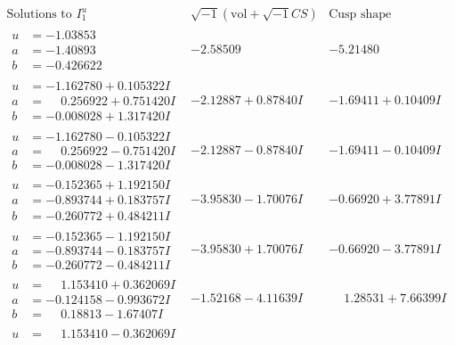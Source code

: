 \documentclass[1p]{elsarticle_modified}
\theoremstyle{definition}
\newcommand{\I}{\sqrt{-1}}
\begin{document}
$$\begin{array}{c|c|c}  
\text{Solutions to }I^u_{1}& \I (\text{vol} + \sqrt{-1}CS) & \text{Cusp shape}\\
 \hline 
\begin{aligned}
u &= -1.03853\phantom{ +0.000000I} \\
a &= -1.40893\phantom{ +0.000000I} \\
b &= -0.426622\phantom{ +0.000000I}\end{aligned}
 & -2.58509\phantom{ +0.000000I} & -5.21480\phantom{ +0.000000I} \\ \hline\begin{aligned}
u &= -1.162780 + 0.105322 I \\
a &= \phantom{-}0.256922 + 0.751420 I \\
b &= -0.008028 + 1.317420 I\end{aligned}
 & -2.12887 + 0.87840 I & -1.69411 + 0.10409 I \\ \hline\begin{aligned}
u &= -1.162780 - 0.105322 I \\
a &= \phantom{-}0.256922 - 0.751420 I \\
b &= -0.008028 - 1.317420 I\end{aligned}
 & -2.12887 - 0.87840 I & -1.69411 - 0.10409 I \\ \hline\begin{aligned}
u &= -0.152365 + 1.192150 I \\
a &= -0.893744 + 0.183757 I \\
b &= -0.260772 + 0.484211 I\end{aligned}
 & -3.95830 - 1.70076 I & -0.66920 + 3.77891 I \\ \hline\begin{aligned}
u &= -0.152365 - 1.192150 I \\
a &= -0.893744 - 0.183757 I \\
b &= -0.260772 - 0.484211 I\end{aligned}
 & -3.95830 + 1.70076 I & -0.66920 - 3.77891 I \\ \hline\begin{aligned}
u &= \phantom{-}1.153410 + 0.362069 I \\
a &= -0.124158 - 0.993672 I \\
b &= \phantom{-}0.18813 - 1.67407 I\end{aligned}
 & -1.52168 - 4.11639 I & \phantom{-}1.28531 + 7.66399 I \\ \hline\begin{aligned}
u &= \phantom{-}1.153410 - 0.362069 I \\

\end{aligned}
\end{array}$$
\end{document}
